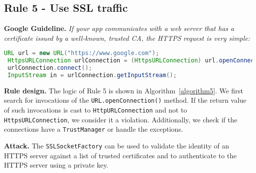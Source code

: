 
\subsection{Rule 5 - Use SSL traffic} 

\textbf{Google Guideline.} \emph{If your app communicates with a web server that has a certificate issued by a well-known, trusted CA, the HTTPS request is very simple: }

\begin{lstlisting}[language=Java, caption=Use SSL traffic, numbers=none]
 URL url = new URL("https://www.google.com");
 HttpsURLConnection urlConnection = (HttpsURLConnection) url.openConnection();
 urlConnection.connect();
 InputStream in = urlConnection.getInputStream();
\end{lstlisting}


\textbf{Rule design.} The logic of Rule 5 is shown in Algorithm~\ref{algorithm5}. 
We first search for invocations of the \texttt{URL.openConnection()} method. If the return value of such invocations is cast to \texttt{HttpURLConnection} and not to \texttt{HttpsURLConnection}, we consider it a violation. Additionally, we check if the connections have a \texttt{TrustManager} or handle the exceptions. 

\setcounter{algocf}{4}
\begin{algorithm}[]
\SetAlgoLined
{}
\caption{}
\label{algorithm5}
\end{algorithm}

\textbf{Attack.} The \texttt{SSLSocketFactory} can be used to validate the identity of an HTTPS server against a list of trusted certificates and to authenticate to the HTTPS server using a private key.

